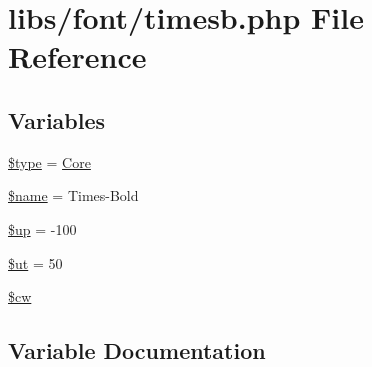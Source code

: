 \hypertarget{timesb_8php}{}\section{libs/font/timesb.php File Reference}
\label{timesb_8php}
\subsection*{Variables}
\begin{DoxyCompactItemize}
\item 
\hyperlink{timesb_8php_a9a4a6fba2208984cabb3afacadf33919}{\$type} = \textquotesingle{}\hyperlink{class_core}{Core}\textquotesingle{}
\item 
\hyperlink{timesb_8php_ab2fc40d43824ea3e1ce5d86dee0d763b}{\$name} = \textquotesingle{}Times-\/Bold\textquotesingle{}
\item 
\hyperlink{timesb_8php_a6b5ad2ac55f9df46e8f34e78fbd6f176}{\$up} = -\/100
\item 
\hyperlink{timesb_8php_aadd3f841051043ee58e587e840e8dd0b}{\$ut} = 50
\item 
\hyperlink{timesb_8php_ac2951b03dbb0317e6c61ec920b7479dc}{\$cw}
\end{DoxyCompactItemize}


\subsection{Variable Documentation}
\hypertarget{timesb_8php_ac2951b03dbb0317e6c61ec920b7479dc}{}
